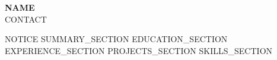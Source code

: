 \documentclass[letterpaper,11pt]{article}
\begin{document}
\begin{center}
    \textbf{\Huge \scshape {{NAME}}} \\ \vspace{1pt}
    \small {{CONTACT}}
\end{center}
{{NOTICE}}
{{SUMMARY_SECTION}}
{{EDUCATION_SECTION}}
{{EXPERIENCE_SECTION}}
{{PROJECTS_SECTION}}
{{SKILLS_SECTION}}
\end{document}
